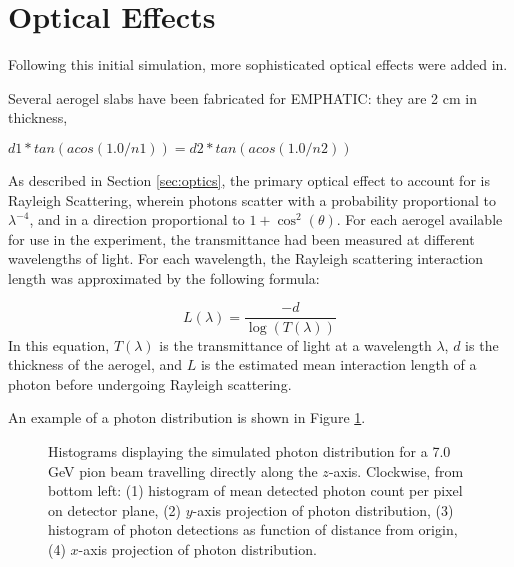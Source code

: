 \section{Optical Effects}
Following this initial simulation, more sophisticated optical effects were added in.

 Several aerogel slabs have been fabricated for EMPHATIC: they are 2 cm in thickness, 

$d1*tan(acos(1.0/n1)) = d2*tan(acos(1.0/n2)) $

As described in Section \ref{sec:optics}, the primary optical effect to account for is Rayleigh Scattering, wherein photons scatter with a probability proportional to $\lambda^{-4}$, and in a direction proportional to $1 + \cos^2(\theta)$.
For each aerogel available for use in the experiment, the transmittance had been measured at different wavelengths of light.
For each wavelength, the Rayleigh scattering interaction length was approximated by the following formula:

$$
L(\lambda) = \frac{-d}{\log(T(\lambda))}
 $$
 In this equation, $T(\lambda)$ is the transmittance of light at a wavelength $\lambda$, $d$ is the thickness of the aerogel, and $L$ is the estimated mean interaction length of a photon before undergoing Rayleigh scattering.


An example of a photon distribution is shown in Figure \ref{fig:photonHist}.

\begin{figure}[]
\centering
{}
\caption[Example of simulated photon distribution for centered 7.0 GeV pion beam]{Histograms displaying the simulated photon distribution for a 7.0 GeV pion beam travelling directly along the $z$-axis. Clockwise, from bottom left: (1) histogram of mean detected photon count per pixel on detector plane, (2) $y$-axis projection of photon distribution, (3) histogram of photon detections as function of distance from origin, (4) $x$-axis projection of photon distribution. }
\label{fig:photonHist} 
\end{figure}

